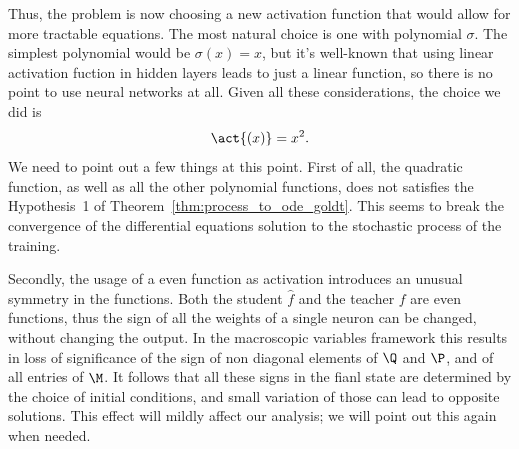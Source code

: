 Thus, the problem is now choosing a new activation function that would allow for more tractable equations.
The most natural choice is one with polynomial \(\sigma\). The simplest polynomial would be \(\sigma(x) = x\),
but it's well-known that using linear activation fuction in hidden layers leads to just a linear function,
so there is no point to use neural networks at all\cite{szandala2021review}. 
Given all these considerations, the choice we did is \[\act{(x)} = x^2.\]
We need to point out a few things at this point.
First of all, the quadratic function, as well as all the other polynomial functions,
does not satisfies the Hypothesis~1 of Theorem~\ref{thm:process_to_ode_goldt}.
This seems to break the convergence of the differential equations solution to the
stochastic process of the training.

Secondly, the usage of a even function as activation introduces an unusual symmetry in 
the functions. Both the student \(\hat{f}\) and the teacher \(f\) are even functions,
thus the sign of all the weights of a single neuron can be changed, without changing 
the output. In the macroscopic variables framework this results in loss of significance
of the sign of non diagonal elements of \(\Q\) and \(\P\), and of all entries of \(\M\).
It follows that all these signs in the fianl state are determined by the choice of initial
conditions, and small variation of those can lead to opposite solutions. This effect 
will mildly affect our analysis; we will point out this again when needed.

